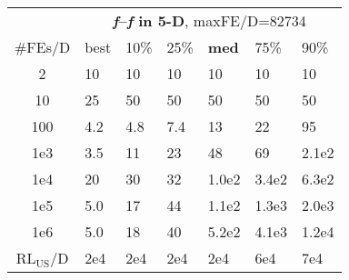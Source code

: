 \begin{tabular}{c|llllll}
 & \multicolumn{6}{|c}{\textbf{\textit{f}\raisebox{-0.35ex}{1}--\textit{f}\raisebox{-0.35ex}{24} in 5-D}, maxFE/D=82734}\\
\#FEs/D & best & 10\% & 25\% & \textbf{med} & 75\% & 90\%\\
2 & 10 & 10 & 10 & 10 & 10 & 10\\
10 & 25 & 50 & 50 & 50 & 50 & 50\\
100 & \hspace*{1ex}4.2 & \hspace*{1ex}4.8 & \hspace*{1ex}7.4 & 13 & 22 & 95\\
1e3 & \hspace*{1ex}3.5 & 11 & 23 & 48 & 69 & 2.1e2\\
1e4 & 20 & 30 & 32 & 1.0e2 & 3.4e2 & 6.3e2\\
1e5 & \hspace*{1ex}5.0 & 17 & 44 & 1.1e2 & 1.3e3 & 2.0e3\\
1e6 & \hspace*{1ex}5.0 & 18 & 40 & 5.2e2 & 4.1e3 & 1.2e4\\
$\text{RL}_{\text{US}}$/D & 2e4 & 2e4 & 2e4 & 2e4 & 6e4 & 7e4
\end{tabular}
